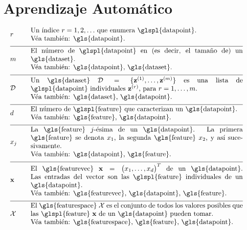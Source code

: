 \section*{Aprendizaje Automático}
\begin{align}
	&\sampleidx &\quad & \parbox{.90\textwidth}{Un índice $\sampleidx=1, 2, \ldots$ que 
		enumera \glspl{datapoint}.
		\\ Véa también: \gls{datapoint}.} \nonumber \\[2mm] \hline \nonumber\\[-5mm]
	&\samplesize &\quad &\parbox{.90\textwidth}{El número de \glspl{datapoint} en (es decir, el tamaño de) un \gls{dataset}.
		\\ Véa también: \gls{datapoint}, \gls{dataset}.} \nonumber \\[2mm] \hline \nonumber\\[-5mm] 
	&\dataset &\quad & \parbox{.90\textwidth}{Un \gls{dataset} $\dataset = \{ \datapoint^{(1)}, \ldots, \datapoint^{(\samplesize)} \}$ 
		es una lista de \glspl{datapoint} individuales $\datapoint^{(\sampleidx)}$, para $\sampleidx=1, \ldots, \samplesize$.
		\\ Véa también: \gls{dataset}, \gls{datapoint}.} \nonumber \\[2mm] \hline \nonumber\\[-5mm]
	&\featurelen &\quad &\parbox{.90\textwidth}{El número de \glspl{feature} que caracterizan un \gls{datapoint}.
		\\ Véa también: \gls{feature}, \gls{datapoint}.} \nonumber \\[2mm] \hline \nonumber\\[-5mm]
	&\feature_{\featureidx} &\quad &\parbox{.90\textwidth}{La \gls{feature} $\featureidx$-ésima de un \gls{datapoint}. La primera \gls{feature} 
		se denota $\feature_{1}$, la segunda \gls{feature} $\feature_{2}$, y así sucesivamente.
		\\ Véa también: \gls{datapoint}, \gls{feature}.} \nonumber \\[2mm] \hline \nonumber\\[-5mm] 
	&\featurevec &\quad &\parbox{.90\textwidth}{El \gls{featurevec} $\featurevec=\big(\feature_{1}, \ldots, \feature_{\featuredim}\big)^{T}$ de un \gls{datapoint}. Las entradas del vector 
		son las \glspl{feature} individuales de un \gls{datapoint}.
		\\ Véa también: \gls{featurevec}, \gls{datapoint}, \gls{feature}.} \nonumber \\[2mm] \hline \nonumber\\[-5mm]
	&\featurespace &\quad & \parbox{.90\textwidth}{El \gls{featurespace} $\featurespace$ es 
		el conjunto de todos los valores posibles que las \glspl{feature} $\featurevec$ de un \gls{datapoint} pueden tomar.
		\\ Véa también: \gls{featurespace}, \gls{feature}, \gls{datapoint}.} \nonumber 
\end{align}        

